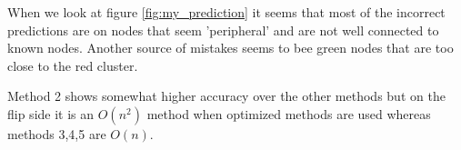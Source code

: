 When we look at figure \ref{fig:my_prediction} it seems that most of the
incorrect predictions are on nodes that seem 'peripheral' and  are not well
connected to known nodes. Another source of mistakes seems to bee green nodes
that are too close to the red cluster.

Method 2 shows somewhat higher accuracy over the other methods but on the flip
side it is an $O(n^2)$ method when optimized methods are used whereas methods
3,4,5 are $O(n)$.
